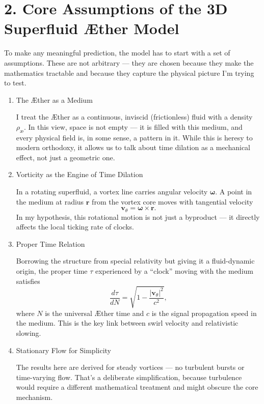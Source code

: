 \documentclass[11pt]{article}
\begin{document}
\section*{2. Core Assumptions of the 3D Superfluid Æther Model}

To make any meaningful prediction, the model has to start with a set of assumptions. These are not arbitrary — they are chosen because they make the mathematics tractable and because they capture the physical picture I’m trying to test.

\begin{enumerate}
    \item The Æther as a Medium

    I treat the Æther as a continuous, inviscid (frictionless) fluid with a density $\rho_{\text{\ae}}$. In this view, space is not empty — it is filled with this medium, and every physical field is, in some sense, a pattern in it. While this is heresy to modern orthodoxy, it allows us to talk about time dilation as a mechanical effect, not just a geometric one.

    \item Vorticity as the Engine of Time Dilation

    In a rotating superfluid, a vortex line carries angular velocity $\boldsymbol{\omega}$. A point in the medium at radius $\mathbf{r}$ from the vortex core moves with tangential velocity
    \[
    \mathbf{v}_\theta = \boldsymbol{\omega} \times \mathbf{r}.
    \]
    In my hypothesis, this rotational motion is not just a byproduct — it directly affects the local ticking rate of clocks.

    \item Proper Time Relation

    Borrowing the structure from special relativity but giving it a fluid-dynamic origin, the proper time $\tau$ experienced by a “clock” moving with the medium satisfies
    \[
    \frac{d\tau}{dN} = \sqrt{ 1 - \frac{|\mathbf{v}_\theta|^2}{c^2} },
    \]
    where $N$ is the universal Æther time and $c$ is the signal propagation speed in the medium. This is the key link between swirl velocity and relativistic slowing.

    \item Stationary Flow for Simplicity

    The results here are derived for steady vortices — no turbulent bursts or time-varying flow. That’s a deliberate simplification, because turbulence would require a different mathematical treatment and might obscure the core mechanism.
\end{enumerate}
\end{document}
